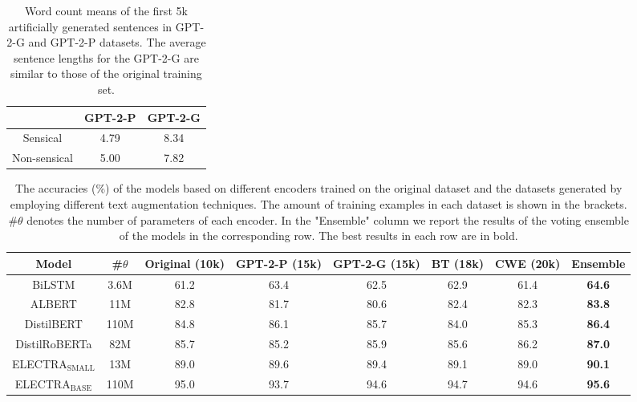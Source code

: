 \documentclass[10pt, a4paper]{article}
\begin{document}
\begin{table}[t]
    \caption{Word count means of the first 5k artificially generated sentences in GPT-2-G and GPT-2-P datasets. The average sentence lengths for the GPT-2-G are similar to those of the original training set.}
    \begin{center}
    \begin{tabular}{ccc}
        \toprule
        & GPT-2-P & GPT-2-G \\
        \midrule
      Sensical & 4.79 &  8.34 \\
      Non-sensical & 5.00 & 7.82 \\
      \bottomrule
    \end{tabular}
    \end{center}
    \label{tab:gptlen}
\end{table}


\begin{table}[ht]
      \caption{The accuracies (\%) of the models based on different encoders trained on the original dataset and the datasets generated by employing different text augmentation techniques. The amount of training examples in each dataset is shown in the brackets. \#$\theta$ denotes the number of parameters of each encoder. In the "Ensemble" column we report the results of the voting ensemble of the models in the corresponding row. The best results in each row are in bold.}
    \begin{center}
        
    \begin{tabular}{cccccccc}
        \toprule
         Model & \#$\theta$ & Original (10k) & GPT-2-P (15k) & GPT-2-G (15k) & BT (18k) & CWE (20k) & Ensemble \\
        \midrule
        BiLSTM & 3.6M & 61.2 & 63.4 & 62.5 & 62.9 & 61.4 & \textbf{64.6}\\
        ALBERT & 11M & 82.8 & 81.7 & 80.6 & 82.4 & 82.3 & \textbf{83.8} \\
        DistilBERT & 110M & 84.8 & 86.1 & 85.7 & 84.0 & 85.3 & \textbf{86.4} \\
        DistilRoBERTa & 82M & 85.7 & 85.2 & 85.9 & 85.6 & 86.2 & \textbf{87.0}\\
        ELECTRA$_\text{SMALL}$ & 13M & 89.0 & 89.6 & 89.4 & 89.1 & 89.0 & \textbf{90.1} \\
        ELECTRA$_\text{BASE}$ & 110M & 95.0 & 93.7 & 94.6 & 94.7 & 94.6 & \textbf{95.6} \\
        \bottomrule
    \end{tabular}
  \end{center}
    \label{table:results}
\end{table}
\end{document}
